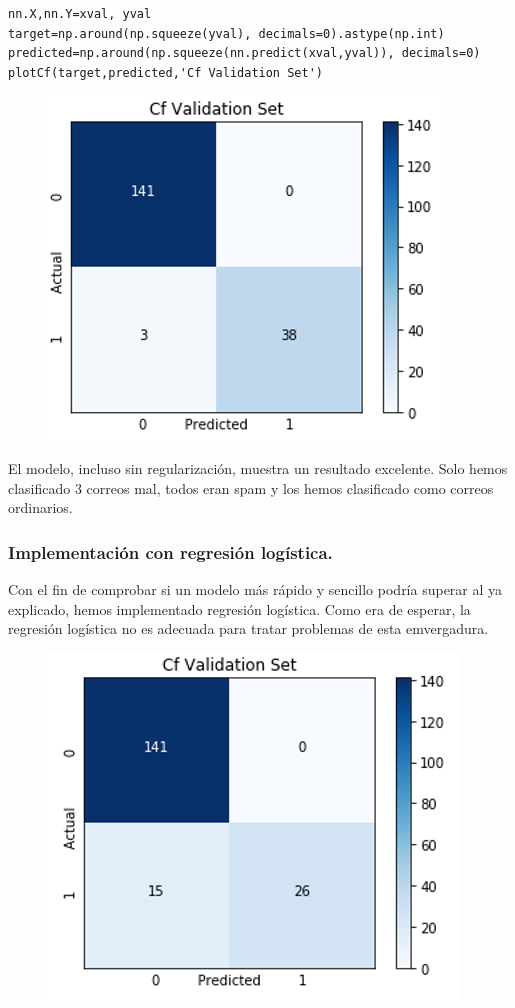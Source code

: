 \documentclass[a4paper,10pt]{article}
\begin{document}
\begin{lstlisting}
nn.X,nn.Y=xval, yval 
target=np.around(np.squeeze(yval), decimals=0).astype(np.int)
predicted=np.around(np.squeeze(nn.predict(xval,yval)), decimals=0)
plotCf(target,predicted,'Cf Validation Set')
\end{lstlisting}
\begin{figure}[H]
\centering
\includegraphics[scale=0.6]{Annotation 2020-03-23 190419}
\end{figure}
El modelo, incluso sin regularización, muestra un resultado excelente. Solo hemos clasificado 3 correos mal, todos eran spam y los hemos clasificado como correos ordinarios.

\subsubsection{Implementación con regresión logística.}
Con el fin de comprobar si un modelo más rápido y sencillo podría superar al ya explicado, hemos implementado regresión logística. Como era de esperar, la regresión logística no es adecuada para tratar problemas de esta emvergadura.
\begin{figure}[H]
\centering
\includegraphics[scale=0.6]{Annotation 2020-03-23 193133.png}
\end{figure}
\end{document}
